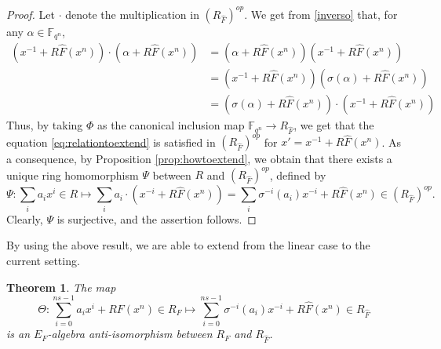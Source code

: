 \documentclass[a4paper, 11pt]{article}
\newtheorem{theorem}{Theorem}[section]
\begin{document}
\begin{proof}
Let $\cdot$ denote the multiplication in $\left(R_{\hat{F}}\right)^{op}$. We get from \eqref{inverso} that, for any \(\alpha \in \mathbb{F}_{q^n}\), 
    \[
    \begin{split}
    (x^{-1}+R\hat{F}(x^n)) \cdot (\alpha + R\hat{F}(x^n)) &= (\alpha + R\hat{F}(x^n))(x^{-1}+R\hat{F}(x^n)) \\
    & = (x^{-1}+R\hat{F}(x^n))(\sigma(\alpha) + R\hat{F}(x^n))\\
    & = (\sigma(\alpha) + R\hat{F}(x^n)) \cdot (x^{-1}+R\hat{F}(x^n))
    \end{split}
    \]
    Thus, by taking $\Phi$ as the canonical inclusion map \(\mathbb{F}_{q^n} \to R_{\hat{F}}\), we get that the equation \eqref{eq:relationtoextend} is satisfied in $\left( R_{\hat{F}} \right)^{op}$ for $x'=x^{-1}+R\hat{F}(x^n)$. As a consequence, by Proposition \ref{prop:howtoextend}, we obtain that there exists a unique ring homomorphism $\Psi$ between $R$ and $\left( R_{\hat{F}} \right)^{op}$, defined by
    \[
    \Psi: \sum_ia_ix^i \in R \longmapsto \sum_i a_i \cdot (x^{-i} +R\hat{F}(x^n))=\sum_i \sigma^{-i}(a_i)x^{-i} + R\hat{F}(x^n) \in \left(R_{\hat{F}}\right)^{op}.
    \]
    Clearly, $\Psi$ is surjective, and the assertion follows.
\end{proof}

By using the above result, we are able to extend \cite[Lemma 26]{gomez2019dual} from the linear case to the current setting. 

\begin{theorem} \label{th:antiwithreciprocal}
   The map \begin{equation} \label{eq:definitionanti}
    \Theta: \sum_{i=0}^{ns-1}a_ix^i+RF(x^n) \in R_F \longmapsto \sum_{i=0}^{ns-1} \sigma^{-i}(a_i)x^{-i} + R\hat{F}(x^n) \in R_{\hat{F}}
    \end{equation}
    is an $E_F$-algebra anti-isomorphism between $R_F$ and $R_{\hat{F}}$.
\end{theorem}
\end{document}
